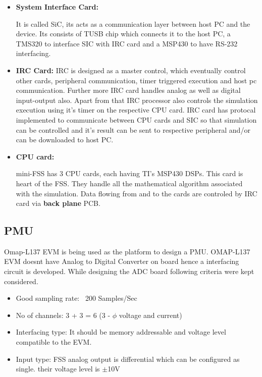\begin{itemize}
\item \textbf{System Interface Card:} 

It is called SiC, its acts as a communication layer between host PC and the device. Its consists of TUSB chip which connects it to the host PC, a TMS320 to interface SIC with IRC card and a MSP430 to have RS-232 interfacing.
\item \textbf{IRC Card:} IRC is designed as a master control, which eventually control other cards, peripheral communication, timer triggered execution and host pc communication. Further more IRC card handles analog as well as digital input-output also. Apart from that IRC processor also controls the simulation execution using it's timer on the respective CPU card. IRC card has protocal implemented to communicate between CPU cards and SIC so that simulation can be controlled and it's result can be sent to respective peripheral and/or can be downloaded to host PC.

\item \textbf{CPU card:} 

mini-FSS has 3 CPU cards, each having TI's MSP430 DSPs. This card is heart of the FSS. They handle all the mathematical algorithm associated with the simulation. Data flowing from and to the cards are controled by IRC card via \textbf{back plane} PCB.
\end{itemize}

\subsection{PMU}
Omap-L137 EVM is being used as the platform to design a PMU. OMAP-L137 EVM doesnt have Analog to Digital Converter on board hence a interfacing circuit is developed. While designing the ADC board following criteria were kept considered.
\begin{itemize}
\item Good sampling rate: ~200 Samples/Sec
\item No of channels: 3 + 3 = 6 (3 - $\phi$ voltage and current) 
\item Interfacing type: It should be memory addressable and voltage level compatible  to the EVM.
\item Input type: FSS analog output is differential which can be configured as single. their voltage level is $\pm$10V
\end{itemize}

